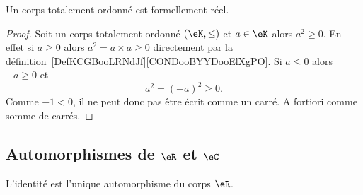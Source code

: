 \begin{proposition}
	Un corps totalement ordonné est formellement réel.
\end{proposition}

\begin{proof}
	Soit un corps totalement ordonné \( (\eK,\leq)\) et \( a\in \eK\) alors \( a^2\geq 0\). En effet si \( a\geq 0\) alors \( a^2=a\times a\geq 0\) directement par la définition~\ref{DefKCGBooLRNdJf}\ref{CONDooBYYDooElXgPO}. Si \( a\leq 0\) alors \( -a\geq 0\) et
	\begin{equation}
		a^2=(-a)^2\geq 0.
	\end{equation}
	Comme \( -1<0\), il ne peut donc pas être écrit comme un carré. A fortiori comme somme de carrés.
\end{proof}

\subsection{Automorphismes de \texorpdfstring{$ \eR$}{R} et \texorpdfstring{$ \eC$}{C}}

\begin{proposition}     \label{PROPooLLPMooIVanaO}
	L'identité est l'unique automorphisme du corps \( \eR\).
\end{proposition}

